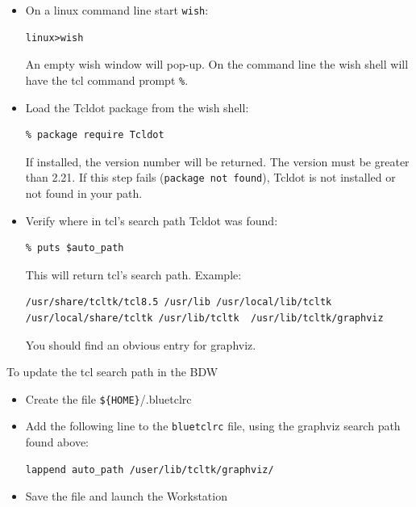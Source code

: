 \documentclass{article}
\newcommand{\te}[1]{\texttt{#1}}
\begin{document}
\begin{itemize}
\item On a linux command line start \te{wish}:
\begin{verbatim}
linux>wish
\end{verbatim}
An empty wish window will pop-up. On the command line the wish shell
will have the tcl  command prompt \te{\%}.

\item Load the Tcldot package from the wish shell:
\begin{verbatim}
% package require Tcldot
\end{verbatim}
If installed, the version number will be returned.  The version must
be greater than 2.21.  If this step fails (\te{package not found}),
 Tcldot is not installed or not found in your path.
\item Verify where in tcl's search path Tcldot was found:
\begin{verbatim}
% puts $auto_path
\end{verbatim}
This will return tcl's search path.  Example:
\begin{verbatim}
/usr/share/tcltk/tcl8.5 /usr/lib /usr/local/lib/tcltk
/usr/local/share/tcltk /usr/lib/tcltk  /usr/lib/tcltk/graphviz
\end{verbatim}
You should find an obvious entry for graphviz.
\end{itemize}

To update the tcl search path in the BDW
\begin{itemize}
\item Create the file \te{\$\{HOME\}}/.bluetclrc
\item Add the following line to the \te{bluetclrc} file, using the
graphviz search path found above:
\begin{verbatim}
lappend auto_path /user/lib/tcltk/graphviz/
\end{verbatim}
\item Save the file and launch the Workstation
\end{itemize}



\end{document}
